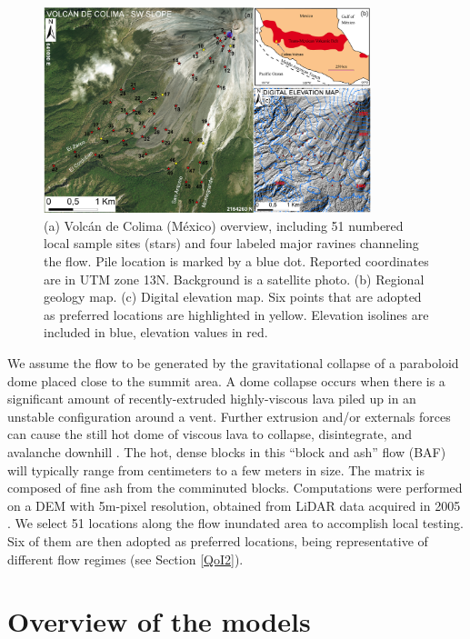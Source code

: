 \documentclass{article}
\begin{document}
\begin{figure}[H]
    \includegraphics[width=0.85\textwidth]{BAF_VolcanDeColima/ColimaFig.jpg}
    \centering
    \caption{(a) Volc{\'a}n de Colima (M{\'e}xico) overview, including 51 numbered local sample sites (stars) and four labeled major ravines channeling the flow. Pile location is marked by a blue dot. Reported coordinates are in UTM zone 13N. Background is a satellite photo. (b) Regional geology map. (c) Digital elevation map. Six points that are adopted as preferred locations are highlighted in yellow. Elevation isolines are included in blue, elevation values in red.}
    \label{fig:Colima-first}
\end{figure}

We assume the flow to be generated by the gravitational collapse of a paraboloid dome placed close to the summit area. A dome collapse occurs when there is a significant amount of recently-extruded highly-viscous lava piled up in an unstable configuration around a vent. Further extrusion and/or externals forces can cause the still hot dome of viscous lava to collapse, disintegrate, and avalanche downhill \citep{Bursik2005, Wolpert2016}. The hot, dense blocks in this ``block and ash'' flow (BAF) will typically range from centimeters to a few meters in size. The matrix is composed of fine ash from the comminuted blocks. Computations were performed on a DEM with 5m-pixel resolution, obtained from LiDAR data acquired in 2005 \citep{Davila2007, Sulpizio2010}. We select 51 locations along the flow inundated area to accomplish local testing. Six of them are then adopted as preferred locations, being representative of different flow regimes (see Section \ref{QoI2}).


\section{Overview of the models}\label{sec:GeoPhFlows}
\end{document}
